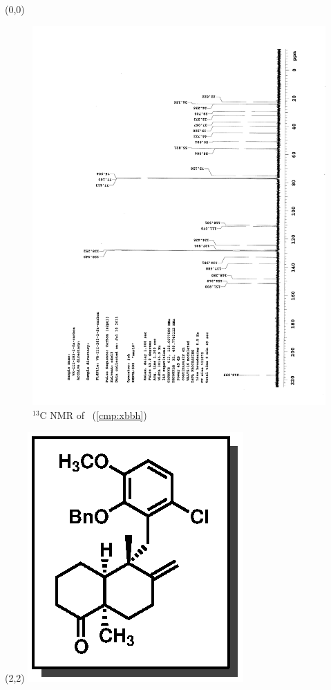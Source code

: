 \clearpage
\begin{textblock}{20}(0,0)
\begin{figure}[htb]
\caption{$^{13}$C NMR of  \CMPxbbh\ (\ref{cmp:xbbh})}
\includegraphics[scale=0.75, trim = 0mm 0mm 0mm 5mm,
clip]{chp_singlecarbon/images/nmr/xbbhC}
\vspace{-100pt}
\end{figure}
\end{textblock}
\begin{textblock}{1}(2,2)
\includegraphics[scale=0.8, angle=90]{chp_singlecarbon/images/xbbh}
\end{textblock}
\clearpage

